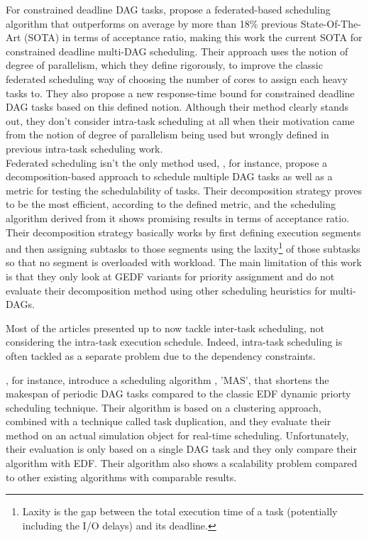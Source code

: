 For constrained deadline DAG tasks, 
\citet{He2023DegreeOfParallelism} propose a federated-based
scheduling algorithm that outperforms on average by more than 18\%
previous State-Of-The-Art\cite{Jiang2023SchedVirtualProcs} (SOTA) in terms of acceptance
ratio, making this work the current SOTA for constrained deadline multi-DAG scheduling.
Their approach uses the notion of degree of parallelism, which they 
define rigorously, to improve the classic federated scheduling way of 
choosing the number of cores to assign each heavy tasks to.
They also propose a new response-time bound for constrained deadline DAG tasks
based on this defined notion.
Although their method clearly stands out,
they don't consider intra-task scheduling at all 
when their motivation came from the notion 
of degree of parallelism being used
but wrongly defined in previous intra-task scheduling work\cite{Zhao2022DAGsched}\cite{zhao2020DAGsched}.\\

Federated scheduling isn't the only method used,
\citet{JiangDecompoSchedParallelTask},
for instance, propose a decomposition-based 
approach to schedule multiple DAG tasks as well as 
a metric for testing the schedulability of tasks.
Their decomposition strategy proves to be the most efficient,
 according to the defined metric, and the scheduling algorithm
derived from it shows promising results in terms of
acceptance ratio.
Their decomposition strategy basically works by first 
defining execution segments and then assigning subtasks 
to those segments using the laxity\footnote{Laxity is the gap between the total execution time of a task (potentially including the I/O delays) and its deadline.} of those subtasks so that 
no segment is overloaded with workload.
The main limitation of this work is that 
they only look at GEDF variants for priority assignment 
and do not evaluate their decomposition method
using other scheduling heuristics for multi-DAGs.

Most of the articles presented up to now 
tackle inter-task scheduling, not considering
the intra-task execution schedule.
Indeed, intra-task scheduling\cite{He2019DagIntra}\cite{Xiao2019}
\cite{Shi2024DagExecGroups}\cite{Zhao2024GATDRLmodel}\cite{Lee2021GlobalDagSchedDRL}
\cite{GuanFRTDS2020RL} is often tackled as a separate
problem due to the dependency constraints.

\citet{Xiao2019}, for instance, introduce a scheduling algorithm 
, 'MAS', that shortens the makespan of periodic DAG tasks
compared to the classic EDF dynamic priorty scheduling technique.
Their algorithm is based on a clustering approach, combined with
a technique called task duplication, and they evaluate their method
on an actual simulation object for real-time scheduling.
Unfortunately, their evaluation is only based on a single DAG task
and they only compare their algorithm with EDF.
Their algorithm also shows a scalability problem compared to 
other existing algorithms with comparable results.

